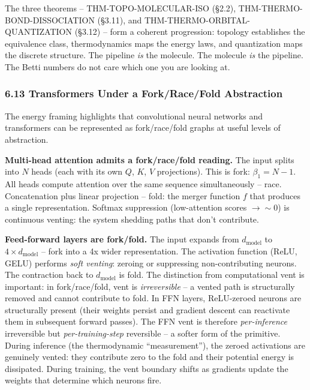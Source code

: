 \documentclass[
  11pt,
]{article}
\begin{document}
The three theorems -- THM-TOPO-MOLECULAR-ISO (§2.2),
THM-THERMO-BOND-DISSOCIATION (§3.11), and
THM-THERMO-ORBITAL-QUANTIZATION (§3.12) -- form a coherent progression:
topology establishes the equivalence class, thermodynamics maps the
energy laws, and quantization maps the discrete structure. The pipeline
\emph{is} the molecule. The molecule \emph{is} the pipeline. The Betti
numbers do not care which one you are looking at.

\subsubsection{6.13 Transformers Under a Fork/Race/Fold
Abstraction}\label{transformers-under-a-forkracefold-abstraction}

The energy framing highlights that convolutional neural networks and
transformers can be represented as fork/race/fold graphs at useful
levels of abstraction.

\textbf{Multi-head attention admits a fork/race/fold reading.} The input
splits into \(N\) heads (each with its own \(Q\), \(K\), \(V\)
projections). This is fork: \(\beta_1 = N - 1\). All heads compute
attention over the same sequence simultaneously -- race. Concatenation
plus linear projection -- fold: the merger function \(f\) that produces
a single representation. Softmax suppression (low-attention scores
\(\to \sim 0\)) is continuous venting: the system shedding paths that
don't contribute.

\textbf{Feed-forward layers are fork/fold.} The input expands from
\(d_{\text{model}}\) to \(4 \times d_{\text{model}}\) -- fork into a 4x
wider representation. The activation function (ReLU, GELU) performs
\emph{soft venting}: zeroing or suppressing non-contributing neurons.
The contraction back to \(d_{\text{model}}\) is fold. The distinction
from computational vent is important: in fork/race/fold, vent is
\emph{irreversible} -- a vented path is structurally removed and cannot
contribute to fold. In FFN layers, ReLU-zeroed neurons are structurally
present (their weights persist and gradient descent can reactivate them
in subsequent forward passes). The FFN vent is therefore
\emph{per-inference} irreversible but \emph{per-training-step}
reversible -- a softer form of the primitive. During inference (the
thermodynamic ``measurement''), the zeroed activations are genuinely
vented: they contribute zero to the fold and their potential energy is
dissipated. During training, the vent boundary shifts as gradients
update the weights that determine which neurons fire.
\end{document}
